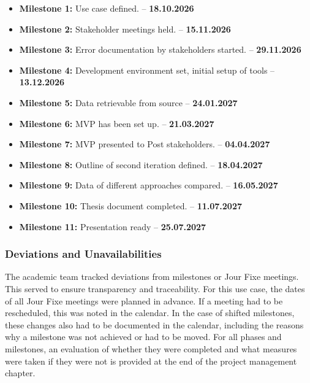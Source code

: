 \begin{itemize}
    \item \textbf{Milestone 1:} Use case defined. -- \textbf{18.10.2026}
    \item \textbf{Milestone 2:} Stakeholder meetings held. -- \textbf{15.11.2026}
    \item \textbf{Milestone 3:} Error documentation by stakeholders started. -- \textbf{29.11.2026}
    \item \textbf{Milestone 4:} Development environment set, initial setup of tools -- \textbf{13.12.2026}
    \item \textbf{Milestone 5:} Data retrievable from source -- \textbf{24.01.2027}
    \item \textbf{Milestone 6:} MVP has been set up. -- \textbf{21.03.2027}
    \item \textbf{Milestone 7:} MVP presented to Post stakeholders. -- \textbf{04.04.2027}
    \item \textbf{Milestone 8:} Outline of second iteration defined. -- \textbf{18.04.2027}
    \item \textbf{Milestone 9:} Data of different approaches compared. -- \textbf{16.05.2027}
    \item \textbf{Milestone 10:} Thesis document completed. -- \textbf{11.07.2027}
    \item \textbf{Milestone 11:} Presentation ready -- \textbf{25.07.2027}
\end{itemize}




\subsubsection*{Deviations and Unavailabilities}
The academic team tracked deviations from milestones or Jour Fixe meetings. This served to ensure transparency and traceability. For this use case, the dates of all Jour Fixe meetings were planned in advance. If a meeting had to be rescheduled, this was noted in the calendar. In the case of shifted milestones, these changes also had to be documented in the calendar, including the reasons why a milestone was not achieved or had to be moved.
For all phases and milestones, an evaluation of whether they were completed and what measures were taken if they were not is provided at the end of the project management chapter.


